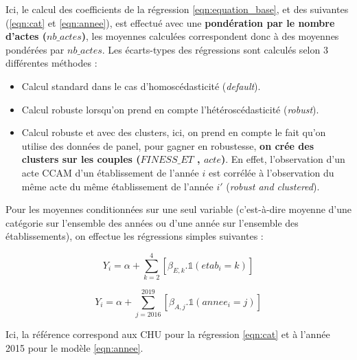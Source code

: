 Ici, le calcul des coefficients de la régression \ref{eqn:equation_base}, et des suivantes (\ref{eqn:cat} et \ref{eqn:annee}), est effectué avec une \textbf{pondération par le nombre d'actes ($nb\_actes$)}, les moyennes calculées correspondent donc à des moyennes pondérées par $nb\_actes$.  Les écarts-types des régressions sont calculés selon 3 différentes méthodes :
\begin{itemize}
    \item Calcul standard dans le cas d'homoscédasticité (\textit{default}).
    \item Calcul robuste lorsqu'on prend en compte l'hétéroscédasticité (\textit{robust}).
    \item Calcul robuste et avec des clusters, ici, on prend en compte le fait qu'on utilise des données de panel, pour gagner en robustesse, \textbf{on crée des clusters sur les couples ($FINESS\_ET$ , $acte$)}. En effet, l'observation d'un acte CCAM d'un établissement de l'année $i$ est corrélée à l'observation du même acte du même établissement de l'année $i'$  (\textit{robust and clustered}).
\end{itemize}

\newpage

Pour les moyennes conditionnées sur une seul variable (c'est-à-dire moyenne d'une catégorie sur l'ensemble des années ou d'une année sur l'ensemble des établissements), on effectue les régressions simples suivantes :

\begin{equation}\label{eqn:cat}
    Y_i = \alpha + \sum_{k=2}^{4}[\beta_{E,k} . \mathbb{1}(etab_i=k)]
\end{equation}

\begin{equation}\label{eqn:annee}
    Y_i = \alpha + \sum_{j=2016}^{2019}[\beta_{A,j} . \mathbb{1}(annee_i=j)]
\end{equation}


Ici, la référence correspond aux CHU pour la régression \ref{eqn:cat} et à l'année 2015 pour le modèle \ref{eqn:annee}.

\bigskip

